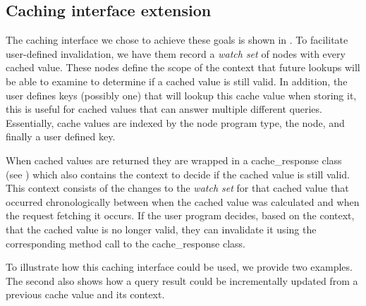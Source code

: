 \documentclass[letterpaper,twocolumn,11pt,tight]{article}
\begin{document}
\subsection{Caching interface extension}

The caching interface we chose to achieve these goals is shown in . To facilitate user-defined invalidation, we have them record a \emph{watch set} of nodes with every cached value. These nodes define the scope of the context that future lookups will be able to examine to determine if a cached value is still valid. 
In addition, the user defines keys (possibly one) that will lookup this cache value when storing it, this is useful for cached values that can answer multiple different queries. 
Essentially, cache values are indexed by the node program type, the node, and finally a user defined key. 

    When cached values are returned they are wrapped in a cache\_response class (see ) which also contains the context to decide if the cached value is still valid. This context consists of the changes to the \emph{watch set} for that cached value that occurred chronologically between when the cached value was calculated and when the request fetching it occurs. If the user program decides, based on the context, that the cached value is no longer valid, they can invalidate it using the corresponding method call to the cache\_response class.
    
    To illustrate how this caching interface could be used, we provide two examples. The second also shows how a query result could be incrementally updated from a previous cache value and its context.
\end{document}
